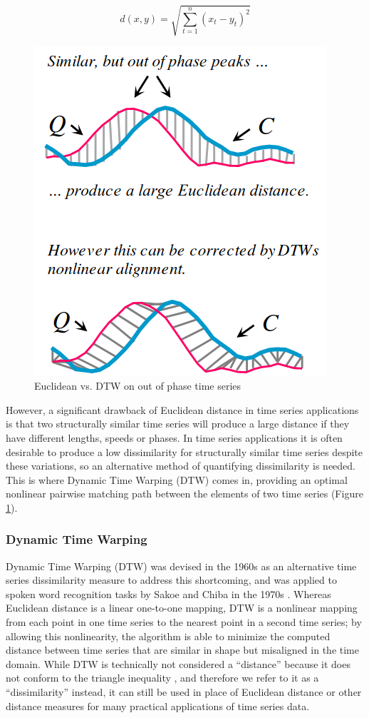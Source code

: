 \documentclass[12pt, letterpaper]{article}
\begin{document}
\begin{equation} \label{euclid}
d(x, y) = \sqrt{\sum_{t=1}^{n}(x_t-y_t)^2}
\end{equation}

\begin{figure}
  \centering
  \includegraphics[height=0.25\textwidth]{img/peaks.png}
  \caption{Euclidean vs. DTW on out of phase time series \cite{rakthanmanon_addressing_2013}}
  \label{peaks}
\end{figure}

However, a significant drawback of Euclidean distance in time series
applications is that two structurally similar time series will produce a large
distance if they have different lengths, speeds or phases. In time series
applications it is often desirable to produce a low dissimilarity for
structurally similar time series despite these variations, so an alternative
method of quantifying dissimilarity is needed. This is where Dynamic Time
Warping (DTW) comes in, providing an optimal nonlinear pairwise matching path
between the elements of two time series (Figure \ref{peaks}).

\subsubsection{Dynamic Time Warping}

Dynamic Time Warping (DTW) was devised in the 1960s as an alternative time
series dissimilarity measure to address this shortcoming, and was applied to
spoken word recognition tasks by Sakoe and Chiba in the 1970s
\cite{sakoe_dynamic_1978}. Whereas Euclidean distance is a linear one-to-one
mapping, DTW is a nonlinear mapping from each point in one time series to the
nearest point in a second time series; by allowing this nonlinearity, the
algorithm is able to minimize the computed distance between time series that are
similar in shape but misaligned in the time domain. While DTW is technically
not considered a ``distance'' because it does not conform to the triangle
inequality \cite{jain_semi-metrification_2018}, and therefore we refer to it as
a ``dissimilarity'' instead, it can still be used in place of Euclidean distance
or other distance measures for many practical applications of time series data.
\end{document}
